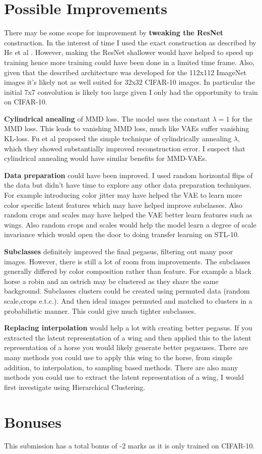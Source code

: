\documentclass{article}
\begin{document}
\section{Possible Improvements}
There may be some scope for improvement by \textbf{tweaking the ResNet} construction. In the interest of time I used the exact construction as described by He et al \cite{ResNet}. However, making the ResNet shallower would have helped to speed up training hence more training could have been done in a limited time frame. Also, given that the described architecture was developed for the 112x112 ImageNet images it's likely not as well suited for 32x32 CIFAR-10 images. In particular the initial 7x7 convolution is likely too large given I only had the opportunity to train on CIFAR-10.

\textbf{Cylindrical anealing} of MMD loss. The model uses the constant $\lambda=1$ for the MMD loss. This leads to vanishing MMD loss, much like VAEs suffer vanishing KL-loss. Fu et al \cite{cylindricalAnnealing} proposed the simple technique of cylindrically annealing $\lambda$, which they showed substantially improved reconstruction error. I suspect that cylindrical annealing would have similar benefits for MMD-VAEs.

\textbf{Data preparation} could have been improved. I used random horizontal flips of the data but didn't have time to explore any other data preparation techniques. For example introducing color jitter may have helped the VAE to learn more color specific latent features which may have helped improve subclasses. Also random crops and scales may have helped the VAE better learn features such as wings. Also random crops and scales would help the model learn a degree of scale invariance which would open the door to doing transfer learning on STL-10.  

\textbf{Subclasses} definitely improved the final pegasus, filtering out many poor images. However, there is still a lot of room from improvements. The subclasses generally differed by color composition rather than feature. For example a black horse a robin and an ostrich may be clustered as they share the same background. Subclasses clusters could be created using permuted data (random scale,crops e.t.c.). And then ideal images permuted and matched to clusters in a probabilistic manner. This could give much tighter subclasses.

\textbf{Replacing interpolation} would help a lot with creating better pegasus. If you extracted the latent representation of a wing and then applied this to the latent representation of a horse you would likely generate better pegasuses. There are many methods you could use to apply this wing to the horse, from simple addition, to interpolation, to sampling based methods. There are also many methods you could use to extract the latent representation of a wing, I would first investigate using Hierarchical Clustering.


\section*{Bonuses}
This submission has a total bonus of -2 marks as it is only trained on CIFAR-10.

\printbibliography
\end{document}

